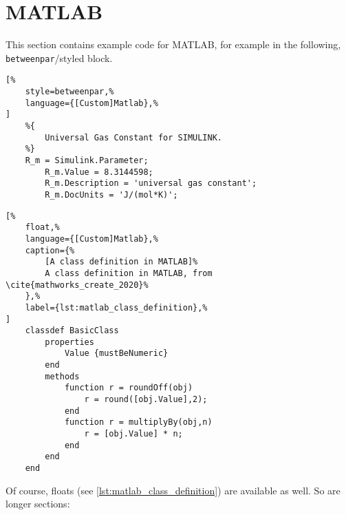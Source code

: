 \section{MATLAB}

This section contains example code for MATLAB, for example in the following,
\texttt{betweenpar}\-/styled block.

\begin{lstlisting}[%
    style=betweenpar,%
    language={[Custom]Matlab},%
]
    %{
        Universal Gas Constant for SIMULINK.
    %}
    R_m = Simulink.Parameter;
        R_m.Value = 8.3144598;
        R_m.Description = 'universal gas constant';
        R_m.DocUnits = 'J/(mol*K)';
\end{lstlisting}

\begin{lstlisting}[%
    float,%
    language={[Custom]Matlab},%
    caption={%
        [A class definition in MATLAB]%
        A class definition in MATLAB, from \cite{mathworks_create_2020}%
    },%
    label={lst:matlab_class_definition},%
]
    classdef BasicClass
        properties
            Value {mustBeNumeric}
        end
        methods
            function r = roundOff(obj)
                r = round([obj.Value],2);
            end
            function r = multiplyBy(obj,n)
                r = [obj.Value] * n;
            end
        end
    end
\end{lstlisting}

Of course, floats (see \cref{lst:matlab_class_definition}) are available as well.
So are longer sections:

